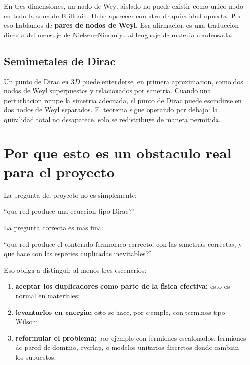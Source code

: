 En tres dimensiones, un nodo de Weyl aislado no puede existir como unico nodo en toda la zona de Brillouin. Debe aparecer con otro de quiralidad opuesta. Por eso hablamos de \textbf{pares de nodos de Weyl}. Esa afirmacion es una traduccion directa del mensaje de Nielsen--Ninomiya al lenguaje de materia condensada.

\subsection{Semimetales de Dirac}

Un punto de Dirac en \(3D\) puede entenderse, en primera aproximacion, como dos nodos de Weyl superpuestos y relacionados por simetria. Cuando una perturbacion rompe la simetria adecuada, el punto de Dirac puede escindirse en dos nodos de Weyl separados. El teorema sigue operando por debajo: la quiralidad total no desaparece, solo se redistribuye de manera permitida.

\section{Por que esto es un obstaculo real para el proyecto}

La pregunta del proyecto no es simplemente:
\begin{displayquote}
\enquote{que red produce una ecuacion tipo Dirac?}
\end{displayquote}

La pregunta correcta es mas fina:
\begin{displayquote}
\enquote{que red produce el contenido fermionico correcto, con las simetrias correctas, y que hace con las especies duplicadas inevitables?}
\end{displayquote}

Eso obliga a distinguir al menos tres escenarios:

\begin{enumerate}[leftmargin=*]
  \item \textbf{aceptar los duplicadores como parte de la fisica efectiva;} esto es normal en materiales;
  \item \textbf{levantarlos en energia;} esto se hace, por ejemplo, con terminos tipo Wilson;
  \item \textbf{reformular el problema;} por ejemplo con fermiones escalonados, fermiones de pared de dominio, overlap, o modelos unitarios discretos donde cambian los supuestos.
\end{enumerate}

